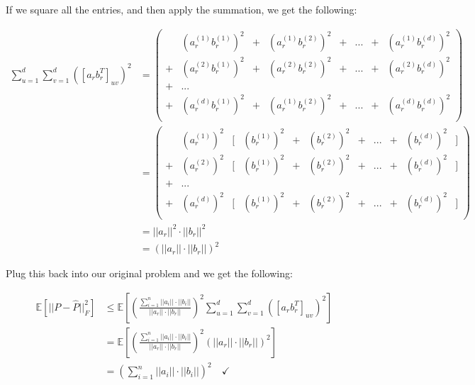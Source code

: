 \documentclass[11pt]{article}
\theoremstyle{definition}
\theoremstyle{case}
\theoremstyle{theorem}
\begin{document}
\begin{enumerate}[label=(\alph*)]
If we square all the entries, and then apply the summation, we get the following:

\begin{align*}
  \sum_{u=1}^{d} \sum_{v=1}^{d} ([a_r b_r^T]_{uv})^2 
   &=
   \left(
     \begin{array}{cccccccc}
         & (a_r^{(1)} b_r^{(1)})^2 & + & (a_r^{(1)} b_r^{(2)})^2 & + & ... & + & (a_r^{(1)} b_r^{(d)})^2 \\
       + & (a_r^{(2)} b_r^{(1)})^2 & + & (a_r^{(2)} b_r^{(2)})^2 & + & ... & + & (a_r^{(2)} b_r^{(d)})^2 \\
       + & ...                     &   &                         &   &     &   &                         \\
       + & (a_r^{(d)} b_r^{(1)})^2 & + & (a_r^{(1)} b_r^{(2)})^2 & + & ... & + & (a_r^{(d)} b_r^{(d)})^2 \\
     \end{array} 
   \right) \\
   &=
   \left(
     \begin{array}{ccccccccccc}
         & (a_r^{(1)})^2 & \big[ & (b_r^{(1)})^2 & + & (b_r^{(2)})^2 & + & ... & + & (b_r^{(d)})^2 & \big] \\
       + & (a_r^{(2)})^2 & \big[ & (b_r^{(1)})^2 & + & (b_r^{(2)})^2 & + & ... & + & (b_r^{(d)})^2 & \big] \\
       + & ...           &       &               &   &               &   &     &   &               &       \\
       + & (a_r^{(d)})^2 & \big[ & (b_r^{(1)})^2 & + & (b_r^{(2)})^2 & + & ... & + & (b_r^{(d)})^2 & \big] \\
     \end{array}
   \right) \\
   &= ||a_r||^2 \cdot ||b_r||^2 \\
   &= \left( ||a_r|| \cdot ||b_r|| \right)^2
\end{align*}

Plug this back into our original problem and we get the following:

\begin{align*}
  \mathbb{E}\left[ ||P - \hat{P}||_F^2 \right] &\leq \mathbb{E}\left[ \left( \frac{\sum_{i=1}^n ||a_i|| \cdot ||b_i||}{||a_r|| \cdot ||b_r||} \right)^2 \sum_{u=1}^{d} \sum_{v=1}^{d} ([a_r b_r^T]_{uv})^2 \right] \\
                                               &= \mathbb{E}\left[ \left( \frac{\sum_{i=1}^n ||a_i|| \cdot ||b_i||}{||a_r|| \cdot ||b_r||} \right)^2 \left( ||a_r|| \cdot ||b_r|| \right)^2 \right] \\
                                               &= \left( \sum_{i=1}^n ||a_i|| \cdot ||b_i|| \right)^2 \quad \checkmark
\end{align*}


\end{enumerate}
\end{document}
